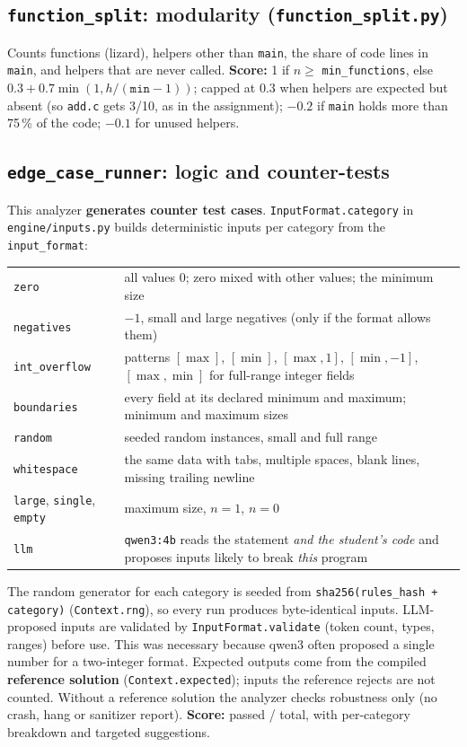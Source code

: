 \documentclass[11pt,a4paper]{article}
\newcommand{\file}[1]{\nolinkurl{#1}}
\newcommand{\fn}[1]{\nolinkurl{#1}}
\begin{document}
\subsection{\texttt{function\_split}: modularity (\texttt{function\_split.py})}
Counts functions (lizard), helpers other than \texttt{main}, the share of code lines in \texttt{main}, and
helpers that are never called.
\textbf{Score:} 1 if $n \ge$ \texttt{min\_functions}, else $0.3 + 0.7\min(1, h/(\texttt{min}-1))$; capped at 0.3 when
helpers are expected but absent (so \texttt{add.c} gets 3/10, as in the assignment); $-0.2$ if \texttt{main} holds more
than 75\,\% of the code; $-0.1$ for unused helpers.

\subsection{\texttt{edge\_case\_runner}: logic and counter-tests}
This analyzer \textbf{generates counter test cases}. \fn{InputFormat.category} in \file{engine/inputs.py}
builds deterministic inputs per category from the \texttt{input\_format}:

\noindent\begin{tabularx}{\textwidth}{@{}>{\raggedright\arraybackslash}p{3.3cm}L@{}}
\toprule
\texttt{zero} & all values 0; zero mixed with other values; the minimum size \\
\texttt{negatives} & $-1$, small and large negatives (only if the format allows them) \\
\texttt{int\_overflow} & patterns $[\max]$, $[\min]$, $[\max,1]$, $[\min,-1]$, $[\max,\min]$ for full-range integer fields \\
\texttt{boundaries} & every field at its declared minimum and maximum; minimum and maximum sizes \\
\texttt{random} & seeded random instances, small and full range \\
\texttt{whitespace} & the same data with tabs, multiple spaces, blank lines, missing trailing newline \\
\texttt{large}, \texttt{single}, \texttt{empty} & maximum size, $n=1$, $n=0$ \\
\texttt{llm} & \texttt{qwen3:4b} reads the statement \emph{and the student's code} and proposes inputs likely to break \emph{this} program \\
\bottomrule
\end{tabularx}

The random generator for each category is seeded from \texttt{sha256(rules\_hash + category)}
(\fn{Context.rng}), so every run produces byte-identical inputs. LLM-proposed inputs are validated by
\fn{InputFormat.validate} (token count, types, ranges) before use. This was necessary because qwen3 often
proposed a single number for a two-integer format. Expected outputs come from the compiled
\textbf{reference solution} (\fn{Context.expected}); inputs the reference rejects are not counted. Without a
reference solution the analyzer checks robustness only (no crash, hang or sanitizer report).
\textbf{Score:} passed / total, with per-category breakdown and targeted suggestions.
\end{document}
